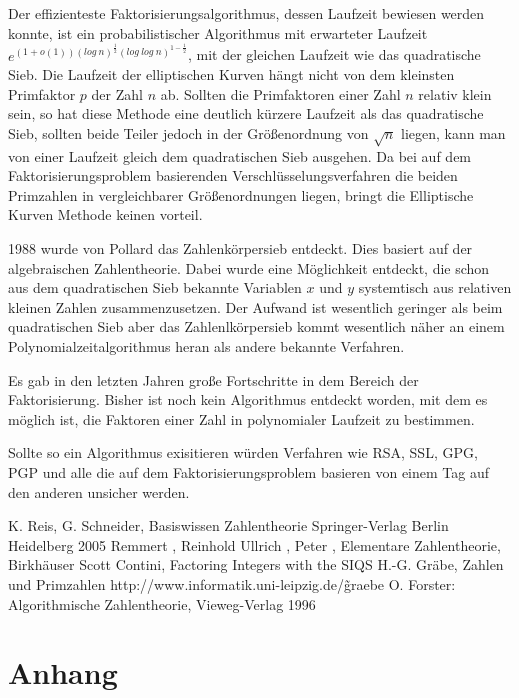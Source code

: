 \documentclass[a4paper,11pt]{article}
\begin{document}
Der effizienteste Faktorisierungsalgorithmus, dessen Laufzeit bewiesen
werden konnte, ist ein probabilistischer Algorithmus mit erwarteter
Laufzeit $e^{(1+o(1))(log\ n)^{\frac{1}{2}}(log\ log\ n)^{1-\frac{1}{2}}}$, mit
der gleichen Laufzeit wie das quadratische Sieb. Die Laufzeit der
elliptischen Kurven hängt nicht von dem kleinsten Primfaktor $p$ der
Zahl $n$ ab. Sollten die Primfaktoren einer Zahl $n$ relativ klein
sein, so hat diese Methode eine deutlich kürzere Laufzeit als das
quadratische Sieb, sollten beide Teiler jedoch in der Größenordnung
von $\sqrt{n}$ liegen, kann man von einer Laufzeit gleich dem
quadratischen Sieb ausgehen. Da bei auf dem Faktorisierungsproblem
basierenden Verschlüsselungsverfahren die beiden Primzahlen in
vergleichbarer Größenordnungen liegen, bringt die Elliptische Kurven
Methode keinen vorteil.

1988 wurde von Pollard das Zahlenkörpersieb entdeckt. Dies basiert auf
der algebraischen Zahlentheorie. Dabei wurde eine Möglichkeit entdeckt,
die schon aus dem quadratischen Sieb bekannte Variablen $x$ und $y$
systemtisch aus relativen kleinen Zahlen zusammenzusetzen. Der Aufwand
ist wesentlich geringer als beim quadratischen Sieb aber das Zahlenlkörpersieb
kommt wesentlich näher an einem Polynomialzeitalgorithmus heran als
andere bekannte Verfahren.

Es gab in den letzten Jahren große Fortschritte in dem Bereich der
Faktorisierung. Bisher ist noch kein Algorithmus entdeckt worden, mit
dem es möglich ist, die Faktoren einer Zahl in polynomialer Laufzeit
zu bestimmen.

Sollte so ein Algorithmus exisitieren würden Verfahren wie RSA,
SSL, GPG, PGP und alle die auf dem Faktorisierungsproblem basieren
von einem Tag auf den anderen unsicher werden.

\begin{thebibliography}{99}
 K. Reis, G. Schneider, Basiswissen Zahlentheorie
Springer-Verlag Berlin Heidelberg 2005
 Remmert , Reinhold Ullrich , Peter , Elementare Zahlentheorie,
Birkhäuser
 Scott Contini, Factoring Integers with the SIQS
 H.-G. Gräbe, Zahlen und Primzahlen http://www.informatik.uni-leipzig.de/\~graebe
 O. Forster: Algorithmische Zahlentheorie, Vieweg-Verlag 1996
\end{thebibliography}

\newpage
\section{Anhang}
\end{document}
